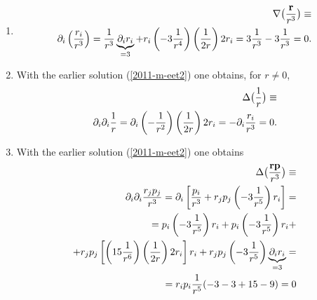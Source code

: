 {\begin{enumerate}
\item
\begin{equation}
\begin{split}
\nabla \bigl({{\bf r} \over r^3} \bigr)\equiv
\\  \partial_i\left(\frac{r_i}{r^3}\right)=
  \frac{1}{r^3}\underbrace{\partial_i r_i}_{=3}+
  r_i\left(-3\frac{1}{r^4}\right)\left(\frac{1}{2r}\right)2r_i=
  3\frac{1}{r^3}-3\frac{1}{r^3}=0 .
\end{split}
\label{2011-m-eet2}
\end{equation}


\item  With the earlier solution (\ref{2011-m-eet2}) one obtains, for $r \neq 0$,
\begin{equation}
\begin{split}
\Delta \bigl({1 \over r} \bigr)\equiv
\\
  \partial_i\partial_i\frac{1}{r}=\partial_i\left(-\frac{1}{r^2}\right)
  \left(\frac{1}{2r}\right)2r_i=-\partial_i\frac{r_i}{r^3}=0   .
\end{split}
\end{equation}


\item  With the earlier solution (\ref{2011-m-eet2}) one obtains
\begin{equation}
\begin{split}
\Delta \bigl({{\bf r} {\bf p} \over r^3} \bigr)\equiv \\
  \partial_i\partial_i\frac{r_jp_j}{r^3}=
    \partial_i
    \left[
      \frac{p_i}{r^3}+r_jp_j\left(-3\frac{1}{r^5}\right)r_i
    \right]= \\
  = p_i\left(-3\frac{1}{r^5}\right)r_i+
    p_i\left(-3\frac{1}{r^5}\right)r_i+ \\
   +r_jp_j
    \left[
      \left(15\frac{1}{r^6}\right)
      \left(\frac{1}{2r}\right)2r_i
    \right]r_i+
    r_jp_j\left(-3\frac{1}{r^5}\right)
    \underbrace{\partial_i r_i}_{=3}= \\
  = r_i p_i \frac{1}{r^5}(-3-3+15-9)=0
\end{split}
\end{equation}




\end{enumerate}}
